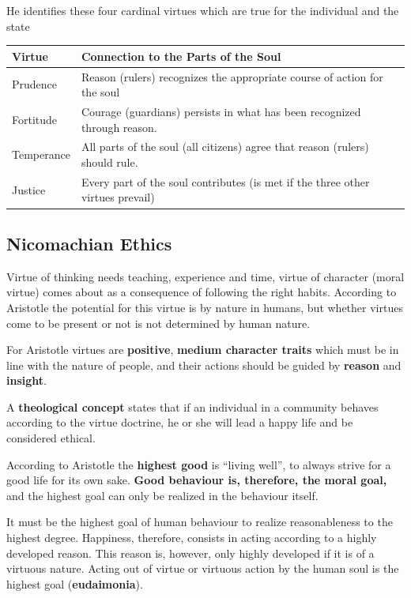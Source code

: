 \documentclass[11pt]{article}
\theoremstyle{definition}
\begin{document}
\clearpage
\noindent
He identifies these four cardinal virtues which are true for the individual and the state
\begin{tabularx}{\linewidth}{|l|l|}
	\hline
	\textbf{Virtue} & \textbf{Connection to the Parts of the Soul}\\
	\hline
	Prudence & Reason (rulers) recognizes the appropriate course of action for the soul \\
	Fortitude & Courage (guardians) persists in what has been recognized through reason. \\
	Temperance & All parts of the soul (all citizens) agree that reason (rulers) should rule. \\
	Justice & Every part of the soul contributes (is met if the three other virtues prevail) \\
	\hline
\end{tabularx}

\subsection{Nicomachian Ethics}
Virtue of thinking needs teaching, experience and time, virtue of character (moral virtue) comes about as a consequence of following the right habits. According to Aristotle the potential for this virtue is by nature in humans, but whether virtues come to be present or not is not determined by human nature.

For Aristotle virtues are \textbf{positive}, \textbf{medium character traits} which must be in line with the nature of people, and their actions should be guided by \textbf{reason} and \textbf{insight}.

\begin{definition}
	A \textbf{theological concept} states that if an individual in a community behaves according to the virtue doctrine, he or she will lead a happy life and be considered ethical.
\end{definition}

According to Aristotle the \textbf{highest good} is \textquotedblleft living well\textquotedblright, to always strive for a good life for its own sake. \textbf{Good behaviour is, therefore, the moral goal,} and the highest goal can only be realized in the behaviour itself.

It must be the highest goal of human behaviour to realize reasonableness to the highest degree. Happiness, therefore, consists in acting according to a highly developed reason. This reason is, however, only highly developed if it is of a virtuous nature. Acting out of virtue or virtuous action by the human soul is the highest goal (\textbf{eudaimonia}).
\end{document}
